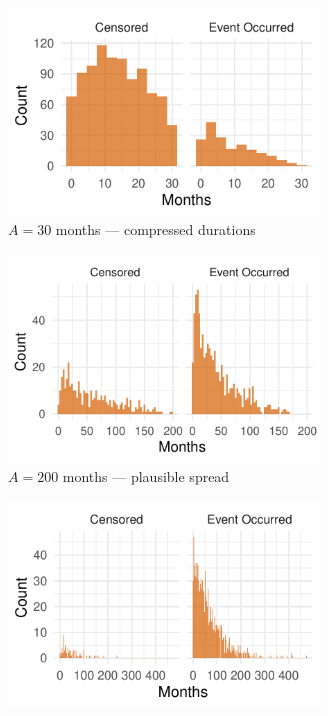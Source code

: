 \begin{example}
\begin{itemize}
\end{itemize}
\begin{figure}[H]
\centering
\begin{subfigure}[t]{0.45\textwidth}
  \centering
  \includegraphics[height=5.5cm,width=\linewidth]{images/fake_duration_hist_a30.pdf}   %
  \caption{{\small $A=30$ months — compressed durations}}
  \label{fig:fake-hist_a30}
\end{subfigure}
\begin{subfigure}[t]{0.45\textwidth}
  \centering
  \includegraphics[height=5.5cm,width=\linewidth]{images/fake_duration_hist_a200.pdf}   %
  \caption{{\small $A=200$ months — plausible spread}}
  \label{fig:fake-hist_a200}
\end{subfigure}
\begin{subfigure}[t]{0.5\textwidth}
  \centering
  \includegraphics[height=5.5cm,width=\linewidth]{images/fake_duration_hist_a1000.pdf}   %

\end{subfigure}
\end{figure}
\end{example}
